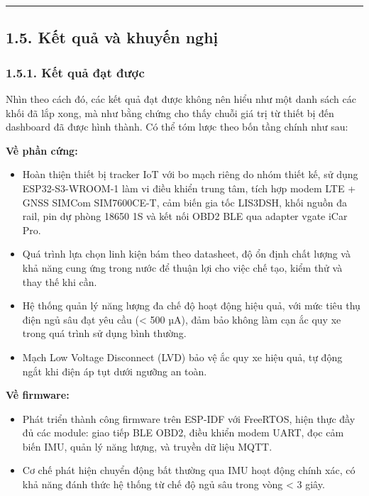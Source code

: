 \documentclass[a4paper]{extarticle}
\providecommand{\tightlist}{%
  \setlength{\itemsep}{0pt}\setlength{\parskip}{0pt}}
\begin{document}
\begin{center}\rule{0.5\linewidth}{0.5pt}\end{center}

\subsection{1.5. Kết quả và khuyến
nghị}\label{15-kux1ebft-quux1ea3-vuxe0-khuyux1ebfn-nghux1ecb}

\subsubsection{1.5.1. Kết quả đạt
được}\label{151-kux1ebft-quux1ea3-ux111ux1ea1t-ux111ux1b0ux1ee3c}

Nhìn theo cách đó, các kết quả đạt được không nên hiểu như một danh sách
các khối đã lắp xong, mà như bằng chứng cho thấy chuỗi giá trị từ thiết
bị đến dashboard đã được hình thành. Có thể tóm lược theo bốn tầng chính
như sau:

\textbf{Về phần cứng:}

\begin{itemize}
\tightlist
\item
  Hoàn thiện thiết bị tracker IoT với bo mạch riêng do nhóm thiết kế, sử
  dụng ESP32-S3-WROOM-1 làm vi điều khiển trung tâm, tích hợp modem LTE
  + GNSS SIMCom SIM7600CE-T, cảm biến gia tốc LIS3DSH, khối nguồn đa
  rail, pin dự phòng 18650 1S và kết nối OBD2 BLE qua adapter vgate iCar
  Pro.
\item
  Quá trình lựa chọn linh kiện bám theo datasheet, độ ổn định chất lượng
  và khả năng cung ứng trong nước để thuận lợi cho việc chế tạo, kiểm
  thử và thay thế khi cần.
\item
  Hệ thống quản lý năng lượng đa chế độ hoạt động hiệu quả, với mức tiêu
  thụ điện ngủ sâu đạt yêu cầu (\textless{} 500 µA), đảm bảo không làm
  cạn ắc quy xe trong quá trình sử dụng bình thường.
\item
  Mạch Low Voltage Disconnect (LVD) bảo vệ ắc quy xe hiệu quả, tự động
  ngắt khi điện áp tụt dưới ngưỡng an toàn.
\end{itemize}

\textbf{Về firmware:}

\begin{itemize}
\tightlist
\item
  Phát triển thành công firmware trên ESP-IDF với FreeRTOS, hiện thực
  đầy đủ các module: giao tiếp BLE OBD2, điều khiển modem UART, đọc cảm
  biến IMU, quản lý năng lượng, và truyền dữ liệu MQTT.
\item
  Cơ chế phát hiện chuyển động bất thường qua IMU hoạt động chính xác,
  có khả năng đánh thức hệ thống từ chế độ ngủ sâu trong vòng
  \textless{} 3 giây.
\end{itemize}
\end{document}
